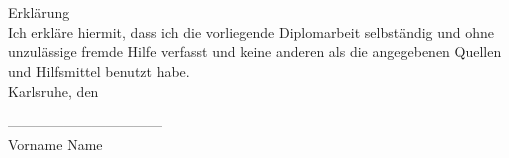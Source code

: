 \chapter*{}
\begin{flushleft}
\vspace{11cm}
Erkl\"arung\\[1cm]
Ich erkl\"{a}re hiermit, dass ich die vorliegende Diplomarbeit
selbst\"{a}ndig und ohne unzul\"{a}ssige fremde Hilfe verfasst und
keine anderen als die angegebenen Quellen und Hilfsmittel benutzt
habe.\\[1cm]

Karlsruhe, den \abgabe\\[1cm]
\end{flushleft}

\begin{center}
---------------------------------\\
Vorname Name
\end{center}
